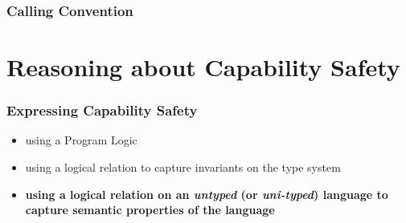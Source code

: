 \documentclass{beamer}
\begin{document}
\begin{frame}
\frametitle{Calling Convention}
%

\end{frame}

\section{Reasoning about Capability Safety}

\begin{frame}
\frametitle{Expressing Capability Safety}

\begin{itemize}
	\item<2-> using a Program Logic 
	\item<3-> using a logical relation to capture invariants on the type system
	\item<4-> \textbf{using a logical relation on an \emph{untyped} (or \emph{uni-typed}) language to capture semantic properties of the language}
\end{itemize}

\end{frame}
\end{document}
